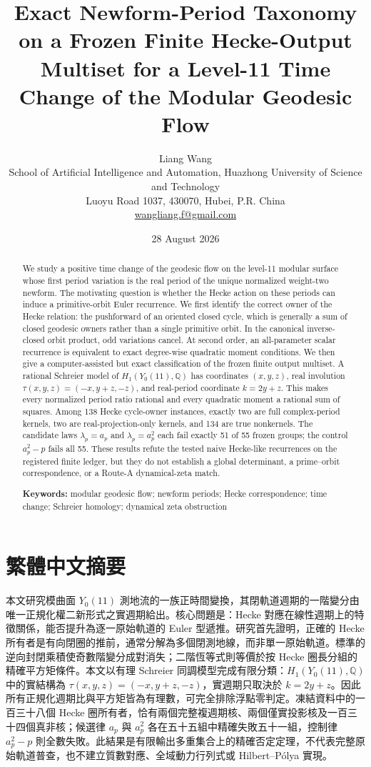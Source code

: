 \documentclass[11pt]{article}
\title{Exact Newform-Period Taxonomy on a Frozen Finite Hecke-Output Multiset for a Level-11 Time Change of the Modular Geodesic Flow}
\author{Liang Wang\\[2pt]
\small School of Artificial Intelligence and Automation, Huazhong University of Science and Technology\\
\small Luoyu Road 1037, 430070, Hubei, P.R. China\\
\small \href{mailto:wangliang.f@gmail.com}{wangliang.f@gmail.com}}
\date{28 August 2026}
\theoremstyle{definition}
\theoremstyle{remark}
\newcommand{\QQ}{\mathbb Q}
\begin{document}
\maketitle

\begin{abstract}
We study a positive time change of the geodesic flow on the level-11 modular surface whose first period variation is the real period of the unique normalized weight-two newform. The motivating question is whether the Hecke action on these periods can induce a primitive-orbit Euler recurrence. We first identify the correct owner of the Hecke relation: the pushforward of an oriented closed cycle, which is generally a sum of closed geodesic owners rather than a single primitive orbit. In the canonical inverse-closed orbit product, odd variations cancel. At second order, an all-parameter scalar recurrence is equivalent to exact degree-wise quadratic moment conditions. We then give a computer-assisted but exact classification of the frozen finite output multiset. A rational Schreier model of $H_1(Y_0(11),\QQ)$ has coordinates $(x,y,z)$, real involution $\tau(x,y,z)=(-x,y+z,-z)$, and real-period coordinate $k=2y+z$. This makes every normalized period ratio rational and every quadratic moment a rational sum of squares. Among 138 Hecke cycle-owner instances, exactly two are full complex-period kernels, two are real-projection-only kernels, and 134 are true nonkernels. The candidate laws $\lambda_p=a_p$ and $\lambda_p=a_p^2$ each fail exactly 51 of 55 frozen groups; the control $a_p^2-p$ fails all 55. These results refute the tested naive Hecke-like recurrences on the registered finite ledger, but they do not establish a global determinant, a prime--orbit correspondence, or a Route-A dynamical-zeta match.

\medskip
\noindent\textbf{Keywords:} modular geodesic flow; newform periods; Hecke correspondence; time change; Schreier homology; dynamical zeta obstruction
\end{abstract}

\section*{繁體中文摘要}
本文研究模曲面 $Y_0(11)$ 測地流的一族正時間變換，其閉軌道週期的一階變分由唯一正規化權二新形式之實週期給出。核心問題是：Hecke 對應在線性週期上的特徵關係，能否提升為逐一原始軌道的 Euler 型遞推。研究首先證明，正確的 Hecke 所有者是有向閉圈的推前，通常分解為多個閉測地線，而非單一原始軌道。標準的逆向封閉乘積使奇數階變分成對消失；二階恆等式則等價於按 Hecke 圈長分組的精確平方矩條件。本文以有理 Schreier 同調模型完成有限分類：$H_1(Y_0(11),\QQ)$ 中的實結構為 $\tau(x,y,z)=(-x,y+z,-z)$，實週期只取決於 $k=2y+z$。因此所有正規化週期比與平方矩皆為有理數，可完全排除浮點零判定。凍結資料中的一百三十八個 Hecke 圈所有者，恰有兩個完整複週期核、兩個僅實投影核及一百三十四個真非核；候選律 $a_p$ 與 $a_p^2$ 各在五十五組中精確失敗五十一組，控制律 $a_p^2-p$ 則全數失敗。此結果是有限輸出多重集合上的精確否定定理，不代表完整原始軌道普查，也不建立質數對應、全域動力行列式或 Hilbert--Pólya 實現。
\end{document}

